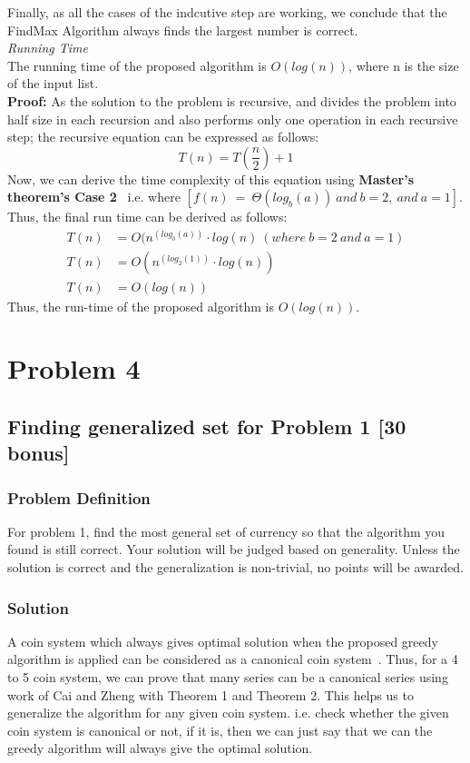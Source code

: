 \documentclass{article}
\begin{document}
Finally, as all the cases of the indcutive step are working, we conclude that the FindMax Algorithm always finds the largest number is correct.\\

\textit{Running Time}\\
The running time of the proposed algorithm is $O(log(n))$, where n is the size of the input list.\\
\textbf{Proof:} As the solution to the problem is recursive, and divides the problem into half size in each recursion and also performs only one operation in each recursive step; the recursive equation can be expressed as follows:
\begin{equation*}
    T(n) = T(\frac{n}{2}) + 1
\end{equation*}
Now, we can derive the time complexity of this equation using \textbf{Master's theorem's Case 2}~\cite{cormen1990introduction} i.e. where $[f(n)\ =\ \Theta(log_b(a))\ and\ b=2,\ and\ a=1]$. Thus, the final run time can be derived as follows:
\begin{align*}
    T(n) & = O(n^{(log_b(a))}\cdot log(n)\ (where\ b = 2\ and\ a = 1)\\
    T(n) & = O(n^{(log_2(1))}\cdot log(n))\\
    T(n) & = O(log(n))
\end{align*}
Thus, the run-time of the proposed algorithm is $O(log(n))$.
\section*{Problem 4}
\subsection*{Finding generalized set for Problem 1 [30 bonus]}
\subsubsection*{Problem Definition}
For problem 1, find the most general set of currency so that the algorithm you found is still correct. Your solution will be judged based on generality. Unless the solution is correct and the generalization is non-trivial, no points will be awarded.
\subsubsection*{Solution}
A coin system which always gives optimal solution when the proposed greedy algorithm is applied can be considered as a canonical coin system~\cite{cai2009canonical}. Thus, for a 4 to 5 coin system, we can prove that many series can be a canonical series using work of Cai and Zheng with Theorem 1 and Theorem 2. This helps us to generalize the algorithm for any given coin system. i.e. check whether the given coin system is canonical or not, if it is, then we can just say that we can the greedy algorithm will always give the optimal solution.~\cite{cai2009canonical}


\end{document}
